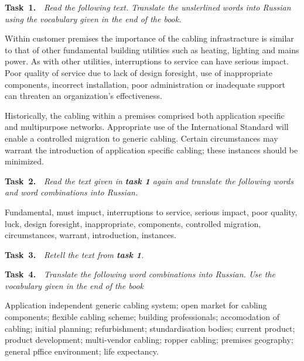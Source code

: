 {\bf Task~1.}~~{\it Read the following text. Translate the unslerlined words into Russian using the
vocabulary given in the end of the book.}\par
Within customer premises the importance of the cabling infrastracture is similar to that of other
fundamental building utilities such as heating, lighting and mains power. As with other utilities,
interruptions to service can have serious impact. Poor quality of service due to lack of design foresight,
use of inappropriate components, incorrect installation, poor administration or inadequate support can
threaten an organization's effectiveness.\par
Historically, the cabling within a premises comprised both application specific and multipurpose
networks. Appropriate use of the International Standard will enable a controlled migration to generic
cabling. Certain circumstances may warrant the introduction of application specific cabling; these
instances should be minimized.\par

{\bf Task~2.}~~{\it Read the text given in {\bf task 1} again and translate the following words and word
combinations into Russian.}\par
Fundamental, must impuct, interruptions to service, serious impact, poor quality, luck, design
foresight, inappropriate, components, controlled migration, circumstances, warrant, introduction, instances.\par

{\bf Task~3.}~~{\it Retell the text from {\bf task 1}.}\par

{\bf Task~4.}~~{\it Translate the following word combinations into Russian. Use the vocabulary given in the end
of the book}\par
Application independent generic cabling system; open market for cabling components; flexible
cabling scheme; building professionals; accomodation of cabling; initial planning; refurbishment;
stundardisation bodies; current product; product development; multi-vendor cabling; ropper cabling;
premises geography; general pffice environment; life expectancy.\par

